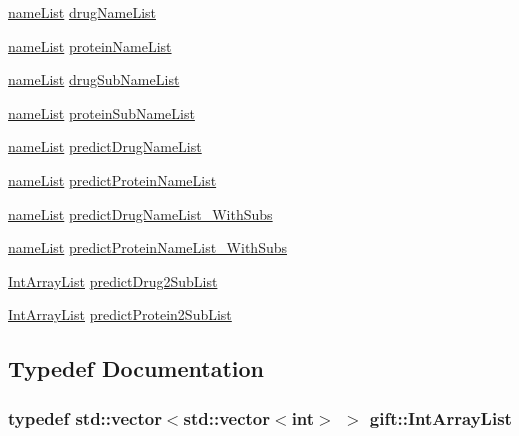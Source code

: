 \begin{DoxyCompactItemize}
\item 
\hyperlink{namespacegift_a62f85efaab3bff48335863ae0670c7a7}{name\+List} \hyperlink{namespacegift_a8ace6c6707676ba4866203d5ddc0a02e}{drug\+Name\+List}
\item 
\hyperlink{namespacegift_a62f85efaab3bff48335863ae0670c7a7}{name\+List} \hyperlink{namespacegift_ac03221463832a0531081c053ed10bafd}{protein\+Name\+List}
\item 
\hyperlink{namespacegift_a62f85efaab3bff48335863ae0670c7a7}{name\+List} \hyperlink{namespacegift_afacd45b62c4abab4c029c7b0e82a149c}{drug\+Sub\+Name\+List}
\item 
\hyperlink{namespacegift_a62f85efaab3bff48335863ae0670c7a7}{name\+List} \hyperlink{namespacegift_a55fa4ad0822bcbe5ca42f2962e111ef1}{protein\+Sub\+Name\+List}
\item 
\hyperlink{namespacegift_a62f85efaab3bff48335863ae0670c7a7}{name\+List} \hyperlink{namespacegift_a9cc6da68eeea28ac6c6a65cd9f248e5b}{predict\+Drug\+Name\+List}
\item 
\hyperlink{namespacegift_a62f85efaab3bff48335863ae0670c7a7}{name\+List} \hyperlink{namespacegift_a03bb78fc438e2b1af29ff3b46b70a085}{predict\+Protein\+Name\+List}
\item 
\hyperlink{namespacegift_a62f85efaab3bff48335863ae0670c7a7}{name\+List} \hyperlink{namespacegift_a85bd1982c5b60a7cf09a0f80398bb051}{predict\+Drug\+Name\+List\+\_\+\+With\+Subs}
\item 
\hyperlink{namespacegift_a62f85efaab3bff48335863ae0670c7a7}{name\+List} \hyperlink{namespacegift_a03aaa96d826b6a887accc3951939ccde}{predict\+Protein\+Name\+List\+\_\+\+With\+Subs}
\item 
\hyperlink{namespacegift_a98b589c33d80e413fceaf8afd8e25815}{Int\+Array\+List} \hyperlink{namespacegift_a00bda5cc17262f36063eed0fbf03459c}{predict\+Drug2\+Sub\+List}
\item 
\hyperlink{namespacegift_a98b589c33d80e413fceaf8afd8e25815}{Int\+Array\+List} \hyperlink{namespacegift_a4899f631bc8342759f4096e7b653eed8}{predict\+Protein2\+Sub\+List}
\end{DoxyCompactItemize}


\subsection{Typedef Documentation}
\subsubsection[{\texorpdfstring{Int\+Array\+List}{IntArrayList}}]{\setlength{\rightskip}{0pt plus 5cm}typedef std\+::vector$<$std\+::vector$<$int$>$ $>$ {\bf gift\+::\+Int\+Array\+List}}\hypertarget{namespacegift_a98b589c33d80e413fceaf8afd8e25815}{}\label{namespacegift_a98b589c33d80e413fceaf8afd8e25815}
